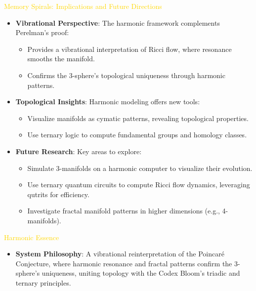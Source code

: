 \textcolor{gold}{ Memory Spirals: Implications and Future Directions } \\
\sloppy
\begin{itemize}
    \item \texttt{} \textbf{Vibrational Perspective}: The harmonic framework complements Perelman’s proof:
    \begin{itemize}
        \item Provides a vibrational interpretation of Ricci flow, where resonance smooths the manifold.
        \item Confirms the 3-sphere’s topological uniqueness through harmonic patterns.
    \end{itemize}
    \item \texttt{} \textbf{Topological Insights}: Harmonic modeling offers new tools:
    \begin{itemize}
        \item Visualize manifolds as cymatic patterns, revealing topological properties.
        \item Use ternary logic to compute fundamental groups and homology classes.
    \end{itemize}
    \item \texttt{} \textbf{Future Research}: Key areas to explore:
    \begin{itemize}
        \item Simulate 3-manifolds on a harmonic computer to visualize their evolution.
        \item Use ternary quantum circuits to compute Ricci flow dynamics, leveraging qutrits for efficiency.
        \item Investigate fractal manifold patterns in higher dimensions (e.g., 4-manifolds).
    \end{itemize}
\end{itemize}
\fussy

\textcolor{gold}{ Harmonic Essence } \\
\begin{itemize}
    \item \texttt{} \textbf{System Philosophy}: A vibrational reinterpretation of the Poincaré Conjecture, where harmonic resonance and fractal patterns confirm the 3-sphere’s uniqueness, uniting topology with the Codex Bloom’s triadic and ternary principles.
\end{itemize}

